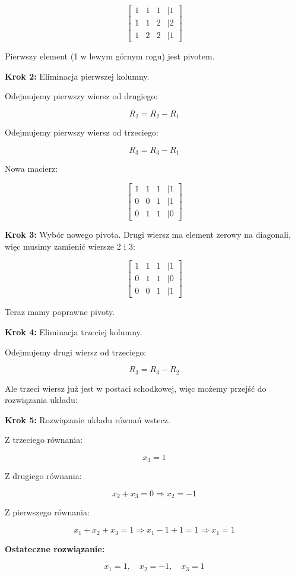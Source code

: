 \documentclass{article}
\begin{document}
\[
\begin{bmatrix}
1 & 1 & 1 & | 1 \\
1 & 1 & 2 & | 2 \\
1 & 2 & 2 & | 1
\end{bmatrix}
\]

Pierwszy element (1 w lewym górnym rogu) jest pivotem.

\textbf{Krok 2:} Eliminacja pierwszej kolumny.

Odejmujemy pierwszy wiersz od drugiego:

\[
R_2 = R_2 - R_1
\]

Odejmujemy pierwszy wiersz od trzeciego:

\[
R_3 = R_3 - R_1
\]

Nowa macierz:

\[
\begin{bmatrix}
1 & 1 & 1 & | 1 \\
0 & 0 & 1 & | 1 \\
0 & 1 & 1 & | 0
\end{bmatrix}
\]

\textbf{Krok 3:} Wybór nowego pivota. Drugi wiersz ma element zerowy na diagonali, więc musimy zamienić wiersze 2 i 3:

\[
\begin{bmatrix}
1 & 1 & 1 & | 1 \\
0 & 1 & 1 & | 0 \\
0 & 0 & 1 & | 1
\end{bmatrix}
\]

Teraz mamy poprawne pivoty.

\textbf{Krok 4:} Eliminacja trzeciej kolumny.

Odejmujemy drugi wiersz od trzeciego:

\[
R_3 = R_3 - R_2
\]

Ale trzeci wiersz już jest w postaci schodkowej, więc możemy przejść do rozwiązania układu:

\textbf{Krok 5:} Rozwiązanie układu równań wstecz.

Z trzeciego równania:

\[
x_3 = 1
\]

Z drugiego równania:

\[
x_2 + x_3 = 0 \Rightarrow x_2 = -1
\]

Z pierwszego równania:

\[
x_1 + x_2 + x_3 = 1 \Rightarrow x_1 - 1 + 1 = 1 \Rightarrow x_1 = 1
\]

\textbf{Ostateczne rozwiązanie:}

\[
x_1 = 1, \quad x_2 = -1, \quad x_3 = 1
\]
\end{document}
